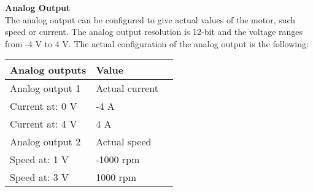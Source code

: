 \textbf{Analog Output}\\
The analog output can be configured to give actual values of the motor, such speed or current. The analog output resolution is 12-bit and the voltage ranges from -4 V to 4 V. The actual configuration of the analog output is the following:
\begin{table}[H]
	\begin{tabular}{|l|l|p{4.3cm}|}
		\hline%
		\textbf{Analog outputs}       &  \textbf{Value}         \\
		\hline%
		Analog output 1                                & Actual current           \\
		\hline%
		Current at: 0 V							  & -4 A              \\
		\hline%
		Current at: 4 V							  & 4 A              \\
		\hline%
		Analog output 2							  & Actual speed              \\
		\hline%
		Speed at: 1 V							  & -1000 rpm               \\
		\hline%
		Speed at: 3 V							  & 1000 rpm               \\
		\hline%
	\end{tabular}
\end{table}

